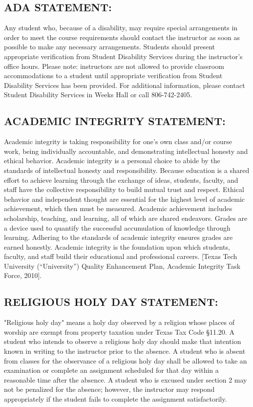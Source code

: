 \documentclass[12pt]{article}
\begin{document}
\subsection*{ADA STATEMENT:}
Any student who, because of a disability, may require special arrangements in order to meet the course requirements should contact the instructor as soon as possible to make any necessary arrangements. Students should present appropriate verification from Student Disability Services during the instructor's office hours. Please note: instructors are not allowed to provide classroom accommodations to a student until appropriate verification from Student Disability Services has been provided. For additional information, please contact Student Disability Services in Weeks Hall or call 806-742-2405.

\subsection*{ACADEMIC INTEGRITY STATEMENT:}
Academic integrity is taking responsibility for one's own class and/or course work, being individually accountable, and demonstrating intellectual honesty and ethical behavior. Academic integrity is a personal choice to abide by the standards of intellectual honesty and responsibility. Because education is a shared effort to achieve learning through the exchange of ideas, students, faculty, and staff have the collective responsibility to build mutual trust and respect. Ethical behavior and independent thought are essential for the highest level of academic achievement, which then must be measured. Academic achievement includes scholarship, teaching, and learning, all of which are shared endeavors. Grades are a device used to quantify the successful accumulation of knowledge through learning. Adhering to the standards of academic integrity ensures grades are earned honestly. Academic integrity is the foundation upon which students, faculty, and staff build their educational and professional careers. [Texas Tech University (“University”) Quality Enhancement Plan, Academic Integrity Task Force, 2010].


\subsection*{RELIGIOUS HOLY DAY STATEMENT:}
"Religious holy day" means a holy day observed by a religion whose places of worship are exempt from property taxation under Texas Tax Code §11.20. A student who intends to observe a religious holy day should make that intention known in writing to the instructor prior to the absence. A student who is absent from classes for the observance of a religious holy day shall be allowed to take an examination or complete an assignment scheduled for that day within a reasonable time after the absence. A student who is excused under section 2 may not be penalized for the absence; however, the instructor may respond appropriately if the student fails to complete the assignment satisfactorily.
\end{document}
